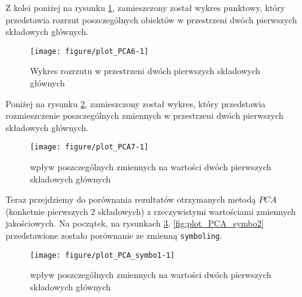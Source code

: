 \documentclass[12pt, a4paper]{article}\usepackage[]{graphicx}\usepackage[]{xcolor}
\makeatletter
\def\maxwidth{ %
  \ifdim\Gin@nat@width>\linewidth
    \linewidth
  \else
    \Gin@nat@width
  \fi
}
\newenvironment{knitrout}{}{} %
\makeatother
\begin{document}
\par
Z kolei poniżej na rysunku \ref{fig:plot_PCA6}, zamieszczony został wykres punktowy, który przedstawia rozrzut poszczególnych obiektów w przestrzeni dwóch pierwszych składowych głównych.
\begin{knitrout}
\color{fgcolor}\begin{figure}[H]

{\centering \texttt{[image: figure/plot\_PCA6-1]} 

}

\caption[Wykres rozrzutu w przestrzeni dwóch pierwszych składowych głównych]{Wykres rozrzutu w przestrzeni dwóch pierwszych składowych głównych}\label{fig:plot_PCA6}
\end{figure}

\end{knitrout}


\par
Poniżej na rysunku \ref{fig:plot_PCA7}, zamieszczony został wykres, który przedstawia rozmieszczenie poszczególnych zmiennych w przestrzeni dwóch pierwszych składowych głównych.
\begin{knitrout}
\color{fgcolor}\begin{figure}[H]

{\centering \texttt{[image: figure/plot\_PCA7-1]} 

}

\caption[wpływ poszczególnych zmiennych na wartości dwóch pierwszych składowych głównych]{wpływ poszczególnych zmiennych na wartości dwóch pierwszych składowych głównych}\label{fig:plot_PCA7}
\end{figure}

\end{knitrout}

Teraz przejdziemy do porównania rezultatów otrzymanych metodą $PCA$ (konketnie pierwszych $2$ składowych) z rzeczywistymi wartościami zmiennych jakościowych. Na początek, na rysunkach \ref{fig:plot_PCA_symbo1}, \ref{fig:plot_PCA_symbo2} przedstawione zostało porównanie ze zmienną \texttt{symboling}.


\begin{knitrout}
\color{fgcolor}\begin{figure}[H]

{\centering \texttt{[image: figure/plot\_PCA\_symbo1-1]} 

}

\caption[wpływ poszczególnych zmiennych na wartości dwóch pierwszych składowych głównych]{wpływ poszczególnych zmiennych na wartości dwóch pierwszych składowych głównych}\label{fig:plot_PCA_symbo1}
\end{figure}

\end{knitrout}
\end{document}
